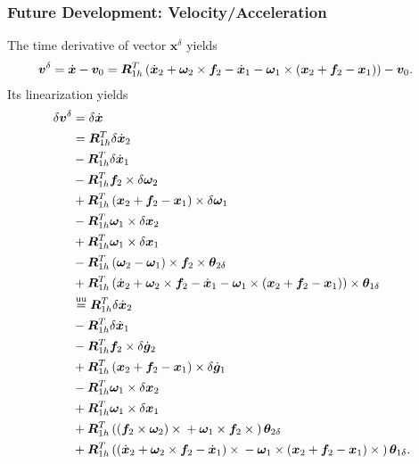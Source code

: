 \documentclass[10pt,fleqn,subeqn]{report}
\newcommand{\T}[1]{\bm{#1}}
\newcommand{\TT}[1]{\bm{#1}}
\newcommand{\equu}{\overset{\text{uu}}{=}}
\begin{document}
\subsubsection{Future Development: Velocity/Acceleration}
The time derivative of vector $\T{x}^{\delta}$ yields
\begin{align}
	\T{v}^{\delta}
	&=
	\dot{\T{x}}
	-
	\T{v}_0
	=
	\TT{R}_{1h}^T \plbr{
		\dot{\T{x}}_2
		+
		\T{\omega}_2 \times \T{f}_2
		-
		\dot{\T{x}}_1
		-
		\T{\omega}_1 \times \plbr{
			\T{x}_2
			+
			\T{f}_2
			-
			\T{x}_1
		}
	}
	-
	\T{v}_0
	.
\end{align}
Its linearization yields
\begin{align}
	\delta\T{v}^{\delta}
	&=
	\delta\dot{\T{x}}
	\nonumber \\
	&=
	\TT{R}_{1h}^T \delta\dot{\T{x}}_2
	\nonumber \\
	&-
	\TT{R}_{1h}^T \delta\dot{\T{x}}_1
	\nonumber \\
	&-
	\TT{R}_{1h}^T \T{f}_2 \times \delta\T{\omega}_2
	\nonumber \\
	&+
	\TT{R}_{1h}^T \plbr{
		\T{x}_2
		+
		\T{f}_2
		-
		\T{x}_1
	} \times \delta\T{\omega}_1
	\nonumber \\
	&-
	\TT{R}_{1h}^T \T{\omega}_1 \times \delta\T{x}_2
	\nonumber \\
	&+
	\TT{R}_{1h}^T \T{\omega}_1 \times \delta\T{x}_1
	\nonumber \\
	&-
	\TT{R}_{1h}^T \plbr{\T{\omega}_2 - \T{\omega}_1} \times \T{f}_2 \times \T{\theta}_{2\delta}
	\nonumber \\
	&+
	\TT{R}_{1h}^T \plbr{
		\dot{\T{x}}_2
		+
		\T{\omega}_2 \times \T{f}_2
		-
		\dot{\T{x}}_1
		-
		\T{\omega}_1 \times \plbr{
			\T{x}_2
			+
			\T{f}_2
			-
			\T{x}_1
		}
	} \times \T{\theta}_{1\delta}
	\nonumber \\
	&\equu
	\TT{R}_{1h}^T \delta\dot{\T{x}}_2
	\nonumber \\
	&-
	\TT{R}_{1h}^T \delta\dot{\T{x}}_1
	\nonumber \\
	&-
	\TT{R}_{1h}^T \T{f}_2 \times \delta\dot{\T{g}}_2
	\nonumber \\
	&+
	\TT{R}_{1h}^T \plbr{
		\T{x}_2
		+
		\T{f}_2
		-
		\T{x}_1
	} \times \delta\dot{\T{g}}_1
	\nonumber \\
	&-
	\TT{R}_{1h}^T \T{\omega}_1 \times \delta\T{x}_2
	\nonumber \\
	&+
	\TT{R}_{1h}^T \T{\omega}_1 \times \delta\T{x}_1
	\nonumber \\
	&+
	\TT{R}_{1h}^T \plbr{
		\plbr{\T{f}_2 \times \T{\omega}_2} \times{}
		+
		\T{\omega}_1 \times \T{f}_2 \times{}
	}
	\T{\theta}_{2\delta}
	\nonumber \\
	&+
	\TT{R}_{1h}^T \plbr{
		\plbr{
			\dot{\T{x}}_2
			+
			\T{\omega}_2 \times \T{f}_2
			-
			\dot{\T{x}}_1
		} \times{}
		-
		\T{\omega}_1 \times \plbr{
			\T{x}_2
			+
			\T{f}_2
			-
			\T{x}_1
		} \times{}
	} \T{\theta}_{1\delta}
	.
\end{align}
\end{document}
